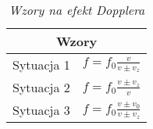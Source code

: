 \begin{table}[!h]
\centering
\begin{tabular}{|ll|}
\hline
\multicolumn{2}{|c|}{\textbf{Wzory}} \\ \hline
\multicolumn{1}{|l|}{Sytuacja 1} &  $f = f_0\frac{v}{v \pm v_z}$ \\ \hline
\multicolumn{1}{|l|}{Sytuacja 2} &  $f = f_0\frac{v \pm v_z}{v}$ \\ \hline
\multicolumn{1}{|l|}{Sytuacja 3} &  $f = f_0\frac{v\pm v_0}{v \pm v_z}$ \\ \hline
\end{tabular}
\caption{\textit{Wzory na efekt Dopplera}}\label{dopler}
\end{table}